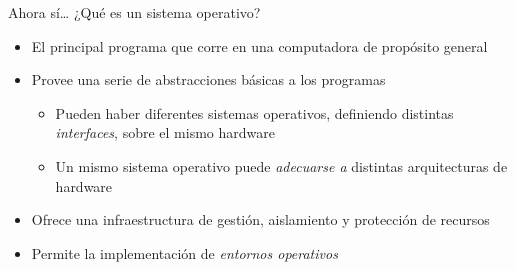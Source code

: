 \begin{frame}{Ahora sí… ¿Qué es un sistema operativo?}
  \begin{itemize}
    \item El principal programa que corre en una computadora de propósito
          general
    \item Provee una serie de abstracciones básicas a los programas
          \begin{itemize}
            \item Pueden haber diferentes sistemas operativos, definiendo distintas
                  \emph{interfaces}, sobre el mismo hardware
            \item Un mismo sistema operativo puede \emph{adecuarse a} distintas
                  arquitecturas de hardware
          \end{itemize}
    \item Ofrece una infraestructura de gestión, aislamiento y protección de
        recursos
    \item Permite la implementación de \emph{entornos operativos}
  \end{itemize}
\end{frame}
